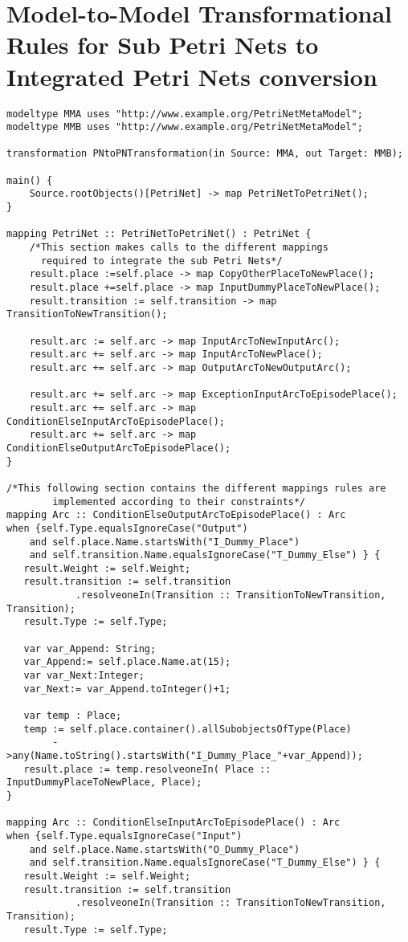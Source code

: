 \section{Model-to-Model Transformational Rules for Sub Petri Nets to Integrated Petri Nets conversion}\label{m2mrules}
\begin{verbatim}
modeltype MMA uses "http://www.example.org/PetriNetMetaModel";
modeltype MMB uses "http://www.example.org/PetriNetMetaModel";

transformation PNtoPNTransformation(in Source: MMA, out Target: MMB);

main() {
	Source.rootObjects()[PetriNet] -> map PetriNetToPetriNet();
}

mapping PetriNet :: PetriNetToPetriNet() : PetriNet {
	/*This section makes calls to the different mappings 
	  required to integrate the sub Petri Nets*/
	result.place :=self.place -> map CopyOtherPlaceToNewPlace();
	result.place +=self.place -> map InputDummyPlaceToNewPlace();
	result.transition := self.transition -> map TransitionToNewTransition();
	
	result.arc := self.arc -> map InputArcToNewInputArc();
	result.arc += self.arc -> map InputArcToNewPlace();
	result.arc += self.arc -> map OutputArcToNewOutputArc();
	
	result.arc += self.arc -> map ExceptionInputArcToEpisodePlace();
	result.arc += self.arc -> map ConditionElseInputArcToEpisodePlace();
	result.arc += self.arc -> map ConditionElseOutputArcToEpisodePlace();
}

/*This following section contains the different mappings rules are 
		implemented according to their constraints*/
mapping Arc :: ConditionElseOutputArcToEpisodePlace() : Arc
when {self.Type.equalsIgnoreCase("Output") 
	and self.place.Name.startsWith("I_Dummy_Place")
	and self.transition.Name.equalsIgnoreCase("T_Dummy_Else") } {
   result.Weight := self.Weight;
   result.transition := self.transition
			.resolveoneIn(Transition :: TransitionToNewTransition, Transition);
   result.Type := self.Type;
      
   var var_Append: String;
   var_Append:= self.place.Name.at(15);
   var var_Next:Integer;
   var_Next:= var_Append.toInteger()+1;
   
   var temp : Place;
   temp := self.place.container().allSubobjectsOfType(Place)
		->any(Name.toString().startsWith("I_Dummy_Place_"+var_Append));
   result.place := temp.resolveoneIn( Place :: InputDummyPlaceToNewPlace, Place);
}

mapping Arc :: ConditionElseInputArcToEpisodePlace() : Arc
when {self.Type.equalsIgnoreCase("Input") 
	and self.place.Name.startsWith("O_Dummy_Place")
	and self.transition.Name.equalsIgnoreCase("T_Dummy_Else") } {
   result.Weight := self.Weight;
   result.transition := self.transition
			.resolveoneIn(Transition :: TransitionToNewTransition, Transition);
   result.Type := self.Type;
     

\end{verbatim}
